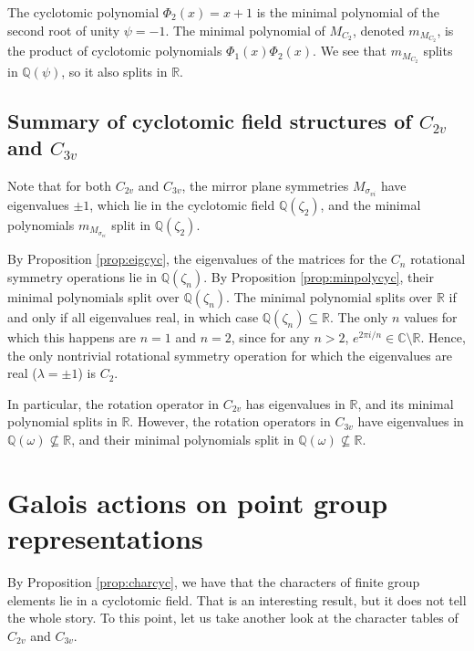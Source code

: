 \documentclass{article}
\begin{document}
    The cyclotomic polynomial $\Phi_2(x)=x+1$ is the minimal polynomial of the second root of unity $\psi=-1$. The minimal polynomial of $M_{C_2}$, denoted $m_{M_{C_2}}$, is the product of cyclotomic polynomials $\Phi_1(x)\Phi_2(x)$. We see that $m_{M_{C_2}}$ splits in $\mathbb{Q}(\psi)$, so it also splits in $\mathbb{R}$.

    \subsection{Summary of cyclotomic field structures of \texorpdfstring{$C_{2v}$ and $C_{3v}$}{C2v and C3v}}

    Note that for both $C_{2v}$ and $C_{3v}$, the mirror plane symmetries $M_{\sigma_{vi}}$ have eigenvalues $\pm1$, which lie in the cyclotomic field $\mathbb{Q}(\zeta_2)$, and the minimal polynomials $m_{M_{\sigma_{vi}}}$ split in $\mathbb{Q}(\zeta_2)$.

    By Proposition \ref{prop:eigcyc}, the eigenvalues of the matrices for the $C_n$ rotational symmetry operations lie in $\mathbb{Q}(\zeta_n)$. By Proposition \ref{prop:minpolycyc}, their minimal polynomials split over $\mathbb{Q}(\zeta_n)$. The minimal polynomial splits over $\mathbb{R}$ if and only if all eigenvalues real, in which case $\mathbb{Q}(\zeta_n)\subseteq\mathbb{R}$. The only $n$ values for which this happens are $n=1$ and $n=2$, since for any $n>2$, $e^{2\pi i/n}\in\mathbb{C}\setminus\mathbb{R}$. Hence, the only nontrivial rotational symmetry operation for which the eigenvalues are real ($\lambda=\pm1$) is $C_2$.

    In particular, the rotation operator in $C_{2v}$ has eigenvalues in $\mathbb{R}$, and its minimal polynomial splits in $\mathbb{R}$. However, the rotation operators in $C_{3v}$ have eigenvalues in $\mathbb{Q}(\omega)\not\subseteq\mathbb{R}$, and their minimal polynomials split in $\mathbb{Q}(\omega)\not\subseteq\mathbb{R}$.

    \section{Galois actions on point group representations}

    By Proposition \ref{prop:charcyc}, we have that the characters of finite group elements lie in a cyclotomic field. That is an interesting result, but it does not tell the whole story. To this point, let us take another look at the character tables of $C_{2v}$ and $C_{3v}$.
\end{document}
